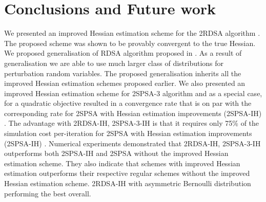 \chapter{Conclusions and Future work}\label{conc}
\label{sec:conclusions}
We presented an improved Hessian estimation scheme for the 2RDSA algorithm \cite{prashanth2015rdsa}. The proposed scheme was shown to be provably convergent to the true Hessian. We proposed generalisation of RDSA algorithm proposed in \cite{prashanth2015rdsa}. As a result of generalisation we are able to use much larger class of distributions  for perturbation random variables. The proposed generalisation inherits all the improved Hessian estimation  schemes proposed earlier. We also presented an improved Hessian estimation scheme for 2SPSA-3 algorithm \cite{bhatnagar2015simultaneous} and as a special case, for a quadratic objective resulted in a  convergence rate that is on par with the corresponding rate for 2SPSA with Hessian estimation improvements (2SPSA-IH) \cite{spall-jacobian}. The advantage with 2RDSA-IH, 2SPSA-3-IH is that it requires only 75\% of the simulation cost per-iteration for 2SPSA with Hessian estimation improvements (2SPSA-IH) \cite{spall-jacobian}. Numerical experiments demonstrated that 2RDSA-IH, 2SPSA-3-IH outperforms both 2SPSA-IH and 2SPSA without the improved Hessian estimation scheme. They also indicate that schemes with improved Hessian estimation outperforms their respective regular schemes without the improved Hessian estimation scheme. 2RDSA-IH with asymmetric Bernoulli distribution performing the best overall.

